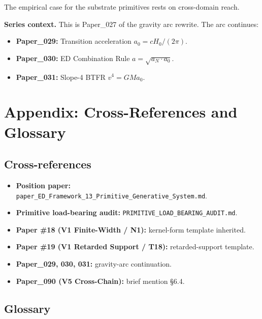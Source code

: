 \documentclass[11pt,a4paper]{article}
\begin{document}
The empirical case for the substrate primitives rests on cross-domain reach.

\textbf{Series context.} This is Paper\_027 of the gravity arc rewrite. The arc continues:

\begin{itemize}[noitemsep]
\item \textbf{Paper\_029:} Transition acceleration $a_0 = cH_0/(2\pi)$.
\item \textbf{Paper\_030:} ED Combination Rule $a = \sqrt{a_N \cdot a_0}$.
\item \textbf{Paper\_031:} Slope-4 BTFR $v^4 = GMa_0$.
\end{itemize}

\section*{Appendix: Cross-References and Glossary}

\subsection*{Cross-references}

\begin{itemize}[noitemsep]
\item \textbf{Position paper:} \texttt{paper\_ED\_Framework\_13\_Primitive\_Generative\_System.md}.
\item \textbf{Primitive load-bearing audit:} \texttt{PRIMITIVE\_LOAD\_BEARING\_AUDIT.md}.
\item \textbf{Paper \#18 (V1 Finite-Width / N1):} kernel-form template inherited.
\item \textbf{Paper \#19 (V1 Retarded Support / T18):} retarded-support template.
\item \textbf{Paper\_029, 030, 031:} gravity-arc continuation.
\item \textbf{Paper\_090 (V5 Cross-Chain):} brief mention \S6.4.
\end{itemize}

\subsection*{Glossary}
\end{document}
